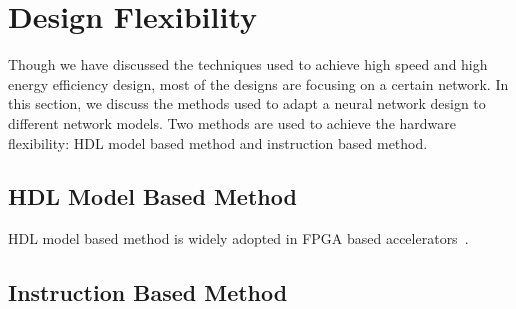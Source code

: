 \section{Design Flexibility}\label{sec:flexibility}

Though we have discussed the techniques used to achieve high speed and high energy efficiency design, most of the designs are focusing on a certain network. In this section, we discuss the methods used to adapt a neural network design to different network models. Two methods are used to achieve the hardware flexibility: HDL model based method and instruction based method.

\subsection{HDL Model Based Method}

HDL model based method is widely adopted in FPGA based accelerators~\cite{venieris2017fpgaconvnet, morcel2017minimalist, ma2017automatic, venieris2017latency, dicecco2016caffeinated, wang2016deepburning, sharma2016high, zhang2016caffeine}.

\subsection{Instruction Based Method}

